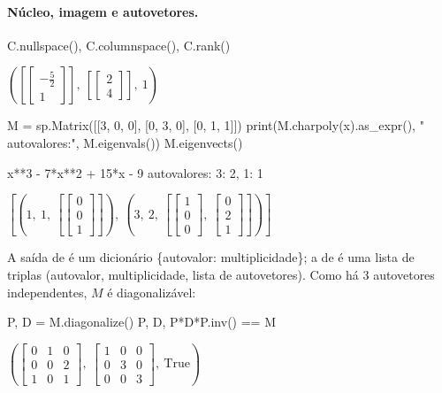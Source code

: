 \paragraph{Núcleo, imagem e autovetores.}

\begin{entrada}
C.nullspace(), C.columnspace(), C.rank()
\end{entrada}
\begin{saidamat}
$\displaystyle \left( \left[ \left[\begin{matrix}- \frac{5}{2}\\1\end{matrix}\right]\right], \  \left[ \left[\begin{matrix}2\\4\end{matrix}\right]\right], \  1\right)$
\end{saidamat}

\begin{entrada}
M = sp.Matrix([[3, 0, 0], [0, 3, 0], [0, 1, 1]])
print(M.charpoly(x).as_expr(), "  autovalores:", M.eigenvals())
M.eigenvects()
\end{entrada}
\begin{saida}
x**3 - 7*x**2 + 15*x - 9   autovalores: {3: 2, 1: 1}
\end{saida}
\begin{saidamat}
$\displaystyle \left[ \left( 1, \  1, \  \left[ \left[\begin{matrix}0\\0\\1\end{matrix}\right]\right]\right), \  \left( 3, \  2, \  \left[ \left[\begin{matrix}1\\0\\0\end{matrix}\right], \  \left[\begin{matrix}0\\2\\1\end{matrix}\right]\right]\right)\right]$
\end{saidamat}

A saída de  é um dicionário \{autovalor: multiplicidade\}; a de  é uma lista de
triplas (autovalor, multiplicidade, lista de autovetores). Como há 3 autovetores independentes, $M$ é diagonalizável:

\begin{entrada}
P, D = M.diagonalize()
P, D, P*D*P.inv() == M
\end{entrada}
\begin{saidamat}
$\displaystyle \left( \left[\begin{matrix}0 & 1 & 0\\0 & 0 & 2\\1 & 0 & 1\end{matrix}\right], \  \left[\begin{matrix}1 & 0 & 0\\0 & 3 & 0\\0 & 0 & 3\end{matrix}\right], \  \text{True}\right)$
\end{saidamat}


